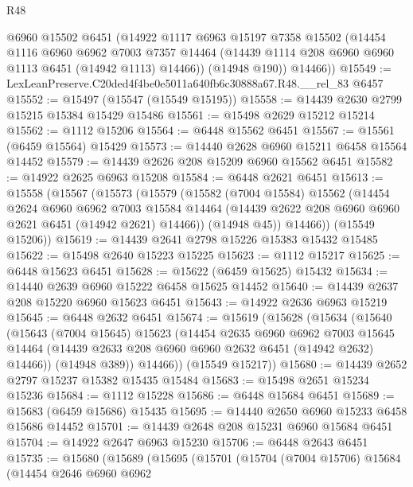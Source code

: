 \begin{lexlean}{R48}
\begin{coremodule}
        @6960
        @15502
        @6451
        (@14922
          @1117
          @6963
          @15197
          @7358
          @15502
          (@14454
            @1116
            @6960
            @6962
            @7003
            @7357
            @14464
            (@14439 @1114 @208 @6960 @6960 @1113 @6451 (@14942 @1113) @14466))
          (@14948 @190))
        @14466))
@15549 := LexLeanPreserve.C20ded4f4be0e5011a640fb6c30888a67.R48.__rel_83 @6457
@15552 := @15497 (@15547 (@15549 @15195))
@15558 := @14439 @2630 @2799 @15215 @15384 @15429 @15486
@15561 := @15498 @2629 @15212 @15214
@15562 := @1112 @15206
@15564 := @6448 @15562 @6451
@15567 := @15561 (@6459 @15564) @15429
@15573 := @14440 @2628 @6960 @15211 @6458 @15564 @14452
@15579 := @14439 @2626 @208 @15209 @6960 @15562 @6451
@15582 := @14922 @2625 @6963 @15208
@15584 := @6448 @2621 @6451
@15613 := @15558
    (@15567
      (@15573
        (@15579
          (@15582
            (@7004 @15584)
            @15562
            (@14454
              @2624
              @6960
              @6962
              @7003
              @15584
              @14464
              (@14439 @2622 @208 @6960 @6960 @2621 @6451 (@14942 @2621) @14466))
            (@14948 @45))
          @14466))
      (@15549 @15206))
@15619 := @14439 @2641 @2798 @15226 @15383 @15432 @15485
@15622 := @15498 @2640 @15223 @15225
@15623 := @1112 @15217
@15625 := @6448 @15623 @6451
@15628 := @15622 (@6459 @15625) @15432
@15634 := @14440 @2639 @6960 @15222 @6458 @15625 @14452
@15640 := @14439 @2637 @208 @15220 @6960 @15623 @6451
@15643 := @14922 @2636 @6963 @15219
@15645 := @6448 @2632 @6451
@15674 := @15619
    (@15628
      (@15634
        (@15640
          (@15643
            (@7004 @15645)
            @15623
            (@14454
              @2635
              @6960
              @6962
              @7003
              @15645
              @14464
              (@14439 @2633 @208 @6960 @6960 @2632 @6451 (@14942 @2632) @14466))
            (@14948 @389))
          @14466))
      (@15549 @15217))
@15680 := @14439 @2652 @2797 @15237 @15382 @15435 @15484
@15683 := @15498 @2651 @15234 @15236
@15684 := @1112 @15228
@15686 := @6448 @15684 @6451
@15689 := @15683 (@6459 @15686) @15435
@15695 := @14440 @2650 @6960 @15233 @6458 @15686 @14452
@15701 := @14439 @2648 @208 @15231 @6960 @15684 @6451
@15704 := @14922 @2647 @6963 @15230
@15706 := @6448 @2643 @6451
@15735 := @15680
    (@15689
      (@15695
        (@15701
          (@15704
            (@7004 @15706)
            @15684
            (@14454
              @2646
              @6960
              @6962

\end{coremodule}
\end{lexlean}

